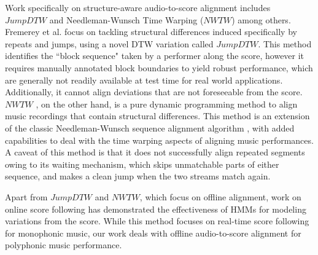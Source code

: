 \documentclass{article}
\begin{document}
\par Work specifically on structure-aware audio-to-score alignment includes \begin{math}\textit{JumpDTW}\end{math} \cite{Fremerey2010handling} and Needleman-Wunsch Time Warping (\begin{math}\textit{NWTW}\end{math}) \cite{grachten2013automatic}  among others. 
Fremerey et al. \cite{Fremerey2010handling} focus on tackling structural differences induced specifically by repeats and jumps, using a novel DTW variation called \begin{math}\textit{JumpDTW}\end{math}. This method identifies the ``block sequence" taken by a performer along the score, however it requires manually annotated block boundaries to yield robust performance, which are generally not readily available at test time for real world applications. Additionally, it cannot align deviations that are not foreseeable from the score. \begin{math}\textit{NWTW}\end{math} \cite{grachten2013automatic}, on the other hand, is a pure dynamic programming method to align
music recordings that contain structural differences. This method is an extension of the classic Needleman-Wunsch sequence alignment algorithm  \cite{likic2008needleman}, with added capabilities to deal with the time warping aspects of aligning music performances. A caveat of this method is that %
it does not successfully align repeated segments owing to its waiting mechanism, which skips unmatchable parts of either sequence, and makes a clean jump when the two streams match again. %
\vspace{-0.1cm}
 \par Apart from \begin{math}\textit{JumpDTW}\end{math} and \begin{math}\textit{NWTW}\end{math}, which focus on offline alignment, work on online score following \cite{nakamura2015real} has demonstrated the effectiveness of HMMs for modeling variations from the score. While this method focuses on real-time score following for monophonic music, our work deals with offline audio-to-score alignment for polyphonic music performance. 
\end{document}
